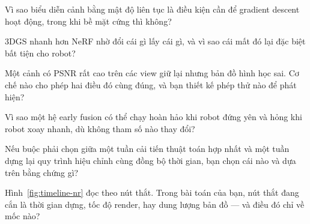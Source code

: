 \documentclass[../../../deep_learning.tex]{subfiles}
\begin{document}
\begin{tukiem}
\item Vì sao biểu diễn cảnh bằng mật độ liên tục là điều kiện cần để gradient descent hoạt động, trong khi bề mặt cứng thì không?
\item 3DGS nhanh hơn NeRF nhờ đổi cái gì lấy cái gì, và vì sao cái mất đó lại đặc biệt bất tiện cho robot?
\item Một cảnh có PSNR rất cao trên các view giữ lại nhưng bản đồ hình học sai. Cơ chế nào cho phép hai điều đó cùng đúng, và bạn thiết kế phép thử nào để phát hiện?
\item Vì sao một hệ early fusion có thể chạy hoàn hảo khi robot đứng yên và hỏng khi robot xoay nhanh, dù không tham số nào thay đổi?
\item Nếu buộc phải chọn giữa một tuần cải tiến thuật toán hợp nhất và một tuần dựng lại quy trình hiệu chỉnh cùng đồng bộ thời gian, bạn chọn cái nào và dựa trên bằng chứng gì?
\item Hình~\ref{fig:timeline-nr} đọc theo nút thắt. Trong bài toán của bạn, nút thắt đang cắn là thời gian dựng, tốc độ render, hay dung lượng bản đồ --- và điều đó chỉ về mốc nào?
\end{tukiem}
\ifSubfilesClassLoaded{\printbibliography[title={Nguồn}]}{}
\end{document}
